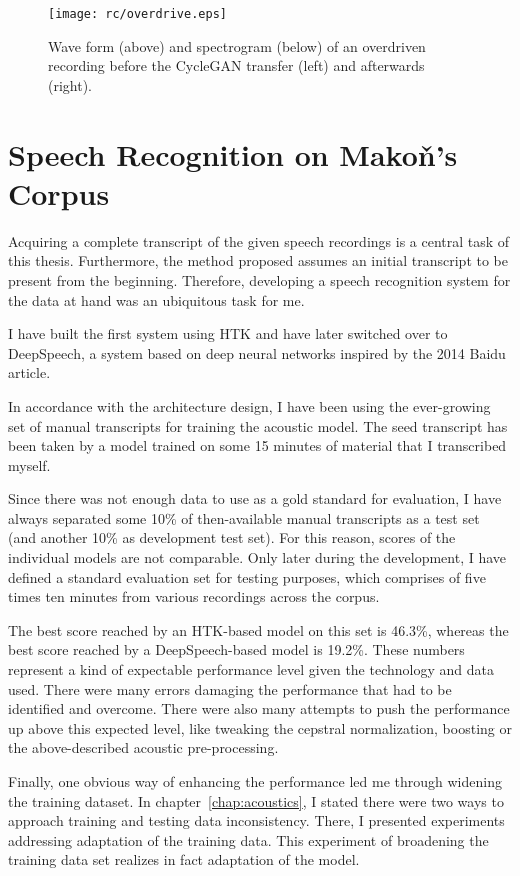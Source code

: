 \documentclass[hidelinks,12pt,a4paper]{report}
\begin{document}
\begin{figure}[tpb]
\centering
\texttt{[image: rc/overdrive.eps]}
\caption{Wave form (above) and spectrogram (below) of an overdriven recording
before the CycleGAN transfer (left) and afterwards (right).}
\label{fig:overdrive}
\end{figure}

\chapter{Speech Recognition on Makoň's Corpus}
\label{chap:svolocz}

Acquiring a complete transcript of the given speech recordings is a central task
of this thesis. Furthermore, the method proposed assumes an initial transcript
to be present from the beginning. Therefore, developing a speech recognition
system for the data at hand was an ubiquitous task for me.

I have built the first system using HTK and have later switched over to
DeepSpeech, a system based on deep neural networks inspired by the 2014 Baidu
article\cite{hannun2014deep}.

In accordance with the architecture design, I have been using the ever-growing
set of manual transcripts for training the acoustic model. The seed transcript
has been taken by a model trained on some 15 minutes of material that I
transcribed myself.

Since there was not enough data to use as a gold standard for evaluation, I have
always separated some 10\% of then-available manual transcripts as a test set
(and another 10\% as development test set). For this reason, scores of the
individual models are not comparable. Only later during the development, I have
defined a standard evaluation set for testing purposes, which comprises of five
times ten minutes from various recordings across the corpus.

The best score reached by an HTK-based model on this set is 46.3\%, whereas the
best score reached by a DeepSpeech-based model is 19.2\%. These numbers
represent a kind of expectable performance level given the technology and data
used. There were many errors damaging the performance that had to be identified
and overcome. There were also many attempts to push the performance up above
this expected level, like tweaking the cepstral normalization, boosting or the
above-described acoustic pre-processing.

Finally, one obvious way of enhancing the performance led me through widening the
training dataset. In chapter~\ref{chap:acoustics}, I stated there were two ways
to approach training and testing data inconsistency. There, I presented
experiments addressing adaptation of the training data. This experiment of
broadening the training data set realizes in fact adaptation of the model.
\end{document}
